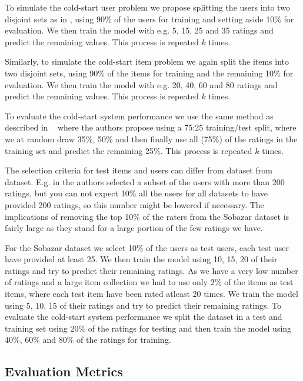 To simulate the cold-start user problem we propose splitting the users into two disjoint sets as in \cite{Stern2009, Lam2008}, 
using 90\% of the users for training and setting aside 10\% for evaluation. We then train the model with e.g. 5, 15, 25 and 35 
ratings and predict the remaining values. This process is repeated $k$ times.

Similarly, to simulate the cold-start item problem we again split the items into two disjoint sets,
 using 90\% of the items for training and the remaining 10\% for evaluation.  We then train the model 
 with e.g. 20, 40, 60 and 80 ratings and predict the remaining values. This process is repeated $k$ times.

To evaluate the cold-start system performance we use the same method as described in ~\cite{Agarwal2009}
where the authors propose using a 75:25 training/test split, where we at random draw 35\%, 50\% 
and then finally use all (75\%) of the ratings in the training set and predict the remaining 25\%. This process is repeated $k$ times.

The selection criteria for test items and users can differ from dataset from dataset. E.g. in \cite{Rashid2002, Rashid2008}
the authors selected a subset of the users with more than 200 ratings, but you can not expect 10\% all the users for all datasets
to have provided 200 ratings, so this number might be lowered if necessary. The implications of removing the top 10\% of 
the raters from the Sobazar dataset is fairly large as they stand for a large portion of the few ratings we have.

For the Sobazar dataset we select 10\% of the users as test users, each test user have provided at least 25. 
We then train the model using 10, 15, 20 of their ratings and try to predict their remaining ratings. As we have a very
low number of ratings and a large item collection we had to use only 2\% of the items as test items, where each
test item have been rated atleast 20 times. We train the model using 5, 10, 15 of their ratings and try to predict
their remaining ratings. To evaluate the cold-start system performance we split the dataset in a test and training
set using 20\% of the ratings for testing and then train the model using 40\%, 60\% and 80\% of the ratings for training.




\subsection{Evaluation Metrics}


